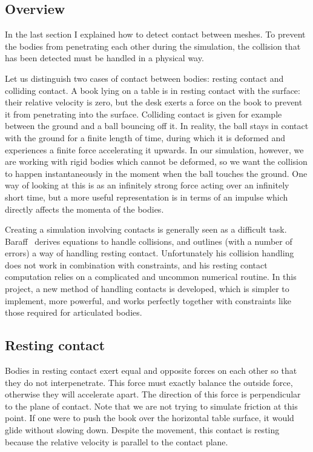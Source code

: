 \subsection{Overview}

In the last section I explained how to detect contact between meshes. To prevent the bodies from
penetrating each other during the simulation, the collision that has been detected must be
handled in a physical way.

Let us distinguish two cases of contact between bodies: resting contact and colliding contact.
A book lying on a table is in resting contact with the surface: their relative velocity is zero,
but the desk exerts a force on the book to prevent it from penetrating into the surface.
Colliding contact is given for example between the ground and a ball bouncing off it. In reality,
the ball stays in contact with the ground for a finite length of time, during which it is
deformed and experiences a finite force accelerating it upwards. In our simulation, however, we
are working with rigid bodies which cannot be deformed, so we want the collision to happen
instantaneously in the moment when the ball touches the ground. One way of looking at this is as
an infinitely strong force acting over an infinitely short time, but a more useful representation
is in terms of an impulse which directly affects the momenta of the bodies.

Creating a simulation involving contacts is generally seen as a difficult task.
Baraff~\cite{BaraffWitkin:97} derives equations to handle collisions, and outlines (with a number
of errors) a way of handling resting contact. Unfortunately his collision handling does not work
in combination with constraints, and his resting contact computation relies on a complicated and
uncommon numerical routine. In this project, a new method of handling contacts is developed, which
is simpler to implement, more powerful, and works perfectly together with constraints like those
required for articulated bodies.


\subsection{Resting contact\label{restingContact}}

Bodies in resting contact exert equal and opposite forces on each other so that they do not
interpenetrate. This force must exactly balance the outside force, otherwise they will accelerate
apart. The direction of this force is perpendicular to the plane of contact.
Note that we are not trying to simulate friction at this point. If one were to push the book over
the horizontal table surface, it would glide without slowing down. Despite the movement, this
contact is resting because the relative velocity is parallel to the contact plane.

